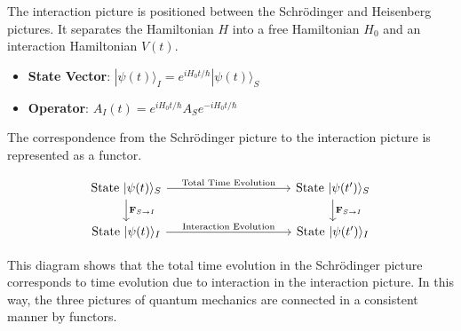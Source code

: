 \documentclass[uplatex,a4j,12pt,dvipdfmx]{jsarticle}
\begin{document}
The interaction picture is positioned between the Schrödinger and Heisenberg pictures. It separates the Hamiltonian $H$ into a free Hamiltonian $H_0$ and an interaction Hamiltonian $V(t)$.

\begin{itemize}
	\item \textbf{State Vector}: $|\psi(t)\rangle_I = e^{iH_0 t/\hbar}|\psi(t)\rangle_S$
	\item \textbf{Operator}: $A_I(t) = e^{iH_0 t/\hbar}A_S e^{-iH_0 t/\hbar}$
\end{itemize}

The correspondence from the Schrödinger picture to the interaction picture is represented as a functor.

$$
\begin{tikzcd}[column sep=10em]
	\text{State } |\psi(t)\rangle_S \arrow[r, "\text{Total Time Evolution}"] \arrow[d, "\mathbf{F}_{S \to I}"] & \text{State } |\psi(t')\rangle_S \arrow[d, "\mathbf{F}_{S \to I}"] \\
	\text{State } |\psi(t)\rangle_I \arrow[r, "\text{Interaction Evolution}"] & \text{State } |\psi(t')\rangle_I
\end{tikzcd}
$$

This diagram shows that the total time evolution in the Schrödinger picture corresponds to time evolution due to interaction in the interaction picture. In this way, the three pictures of quantum mechanics are connected in a consistent manner by functors.
\end{document}
